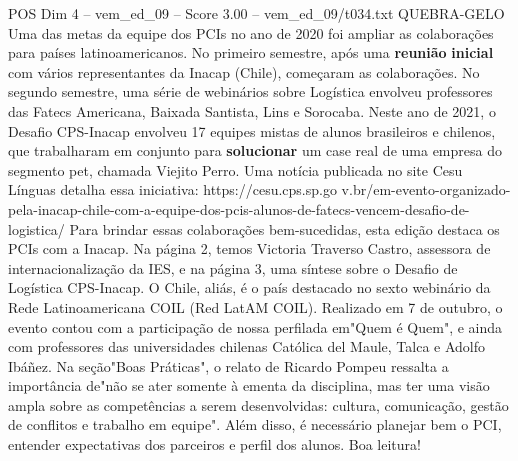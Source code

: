 \begin{textsample}{POS Dim 4 – vem\_ed\_09 – Score 3.00 – vem\_ed\_09/t034.txt}  \label{ex:f4_pos_157}
QUEBRA-GELO Uma das metas da equipe dos PCIs no ano de 2020 foi ampliar as colaborações para países latinoamericanos.
No primeiro semestre, após uma \textbf{reunião} \textbf{inicial} com vários representantes da Inacap (Chile), começaram as colaborações.
No segundo semestre, uma série de webinários sobre Logística envolveu professores das Fatecs Americana, Baixada Santista, Lins e Sorocaba.
Neste ano de 2021, o Desafio CPS-Inacap envolveu 17 equipes mistas de alunos brasileiros e chilenos, que trabalharam em conjunto para \textbf{solucionar} um case real de uma empresa do segmento pet, chamada Viejito Perro.
Uma notícia publicada no site Cesu Línguas detalha essa iniciativa: https://cesu.cps.sp.go v.br/em-evento-organizado-pela-inacap-chile-com-a-equipe-dos-pcis-alunos-de-fatecs-vencem-desafio-de-logistica/ Para brindar essas colaborações bem-sucedidas, esta edição destaca os PCIs com a Inacap.
Na página 2, temos Victoria Traverso Castro, assessora de internacionalização da IES, e na página 3, uma síntese sobre o Desafio de Logística CPS-Inacap.
O Chile, aliás, é o país destacado no sexto webinário da Rede Latinoamericana COIL (Red LatAM COIL).
Realizado em 7 de outubro, o evento contou com a participação de nossa perfilada em"Quem é Quem", e ainda com professores das universidades chilenas Católica del Maule, Talca e Adolfo Ibáñez.
Na seção"Boas Práticas", o relato de Ricardo Pompeu ressalta a importância de"não se ater somente à ementa da disciplina, mas ter uma visão ampla sobre as competências a serem desenvolvidas: cultura, comunicação, gestão de conflitos e trabalho em equipe".
Além disso, é necessário planejar bem o PCI, entender expectativas dos parceiros e perfil dos alunos.
Boa leitura!

\end{textsample}
